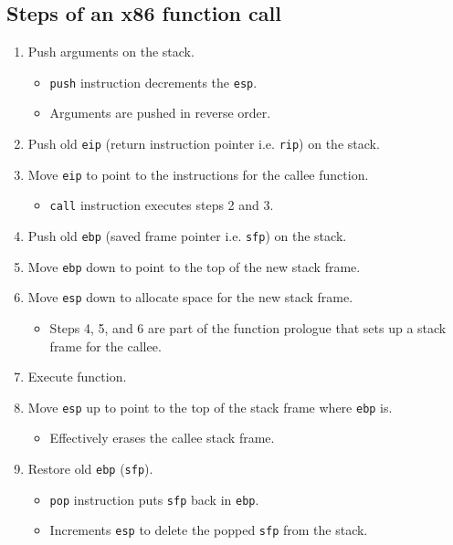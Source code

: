 \subsection{Steps of an x86 function call}
\begin{enumerate}
    \item Push arguments on the stack.
    \begin{itemize}
        \item \texttt{push} instruction decrements the \texttt{esp}.
        \item Arguments are pushed in reverse order.
    \end{itemize}
    
    \item Push old \texttt{eip} (return instruction pointer i.e. \texttt{rip}) on the stack.
    
    \item Move \texttt{eip} to point to the instructions for the callee function.
    \begin{itemize}
        \item \texttt{call} instruction executes steps 2 and 3.
    \end{itemize}
    
    \item Push old \texttt{ebp} (saved frame pointer i.e. \texttt{sfp}) on the stack.
    
    \item Move \texttt{ebp} down to point to the top of the new stack frame.
    
    \item Move \texttt{esp} down to allocate space for the new stack frame.
    \begin{itemize}
        \item Steps 4, 5, and 6 are part of the function prologue that sets up a stack frame for the callee.
    \end{itemize}
    
    \item Execute function.
    
    \item Move \texttt{esp} up to point to the top of the stack frame where \texttt{ebp} is.
    \begin{itemize}
        \item Effectively erases the callee stack frame.
    \end{itemize}
    
    \item Restore old \texttt{ebp} (\texttt{sfp}).
    \begin{itemize}
        \item \texttt{pop} instruction puts \texttt{sfp} back in \texttt{ebp}.
        \item Increments \texttt{esp} to delete the popped \texttt{sfp} from the stack.
    \end{itemize}
    

\end{enumerate}
